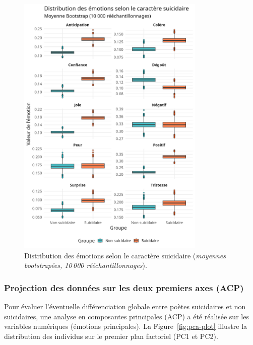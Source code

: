\begin{figure}[H]
	\centering
	\includegraphics[width=0.8\textwidth]{images/boxplot-emotions-suicidal-bootstrap-10000.png}
	\caption{Distribution des émotions selon le caractère suicidaire (\emph{moyennes bootstrapées, 10\,000 rééchantillonnages}).}
	\label{fig:boxplot-emotions-suicidal-bootstrap}
\end{figure}

\noindent


\subsubsection{Projection des données sur les deux premiers axes (ACP)}

Pour évaluer l’éventuelle différenciation globale entre poètes suicidaires et non suicidaires, 
une analyse en composantes principales (ACP) a été réalisée sur les variables numériques
(émotions principales). La Figure~\ref{fig:pca-plot} illustre la distribution des individus 
sur le premier plan factoriel (PC1 et PC2).

